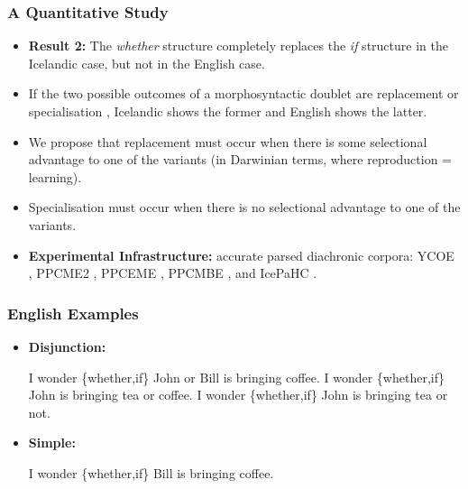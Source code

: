 \documentclass[hyperref={pdfpagelabels=false}]{beamer}
\begin{document}
\begin{frame}
\frametitle{A Quantitative Study}
\begin{itemize}
	\item \textbf{Result 2:} The \textsl{whether} structure completely replaces the \textsl{if} structure in the Icelandic case, but not in the English case.
	\item If the two possible outcomes of a morphosyntactic doublet are replacement or specialisation \citep{kroch1994}, Icelandic shows the former and English shows the latter.
	\item We propose that replacement must occur when there is some selectional advantage to one of the variants (in Darwinian terms, where reproduction = learning).
	\item Specialisation must occur when there is no selectional advantage to one of the variants.
	\item \textbf{Experimental Infrastructure:} accurate parsed diachronic corpora: \small{ YCOE \citep{ycoe}, PPCME2 \citep{ppcme2}, PPCEME \citep{ppceme}, PPCMBE \citep{ppcmbe}, and IcePaHC \citep{icepahc09}.}
	
\end{itemize}
\end{frame}

\begin{frame}
\frametitle{English Examples}
\begin{itemize}
\item[ ]\textbf{Disjunction:}
\begin{exe}
	\ex I wonder \{whether,if\} John or Bill is bringing coffee.
	\ex I wonder \{whether,if\} John is bringing tea or coffee.
	\ex I wonder \{whether,if\} John is bringing tea or not.
\end{exe}
\item[ ]\textbf{Simple:}
\begin{exe}
	\ex I wonder \{whether,if\} Bill is bringing coffee.
\end{exe}
\end{itemize}
\end{frame}
\end{document}
